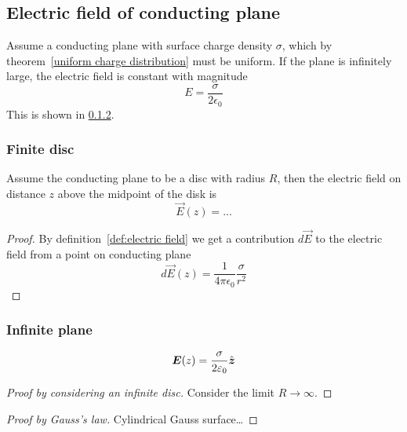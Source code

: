 \subsection{Electric field of conducting plane}
\label{electric field of conducting plane}

Assume a conducting plane with surface charge density $\sigma$, which
by theorem~\ref{uniform charge distribution} must be uniform. If the
plane is infinitely large, the electric field is constant with magnitude
\begin{equation*}
  E = \frac{\sigma}{2\epsilon_0}
\end{equation*}
This is shown in \ref{electric field of conducting plane infinite}.

\subsubsection{Finite disc}

Assume the conducting plane to be a disc with radius $R$, then the
electric field on distance $z$ above the midpoint of the disk is
\begin{equation*}
  \vec{E}(z) = ...
\end{equation*}
\begin{proof}
  By definition~\ref{def:electric field} we get a contribution
  $d\vec{E}$ to the electric field from a point on conducting plane
  \begin{equation*}
    d\vec{E}(z)=\frac{1}{4\pi\epsilon_0}\frac{\sigma}{r^2}
  \end{equation*}
\end{proof}

\subsubsection{Infinite plane}
\label{electric field of conducting plane infinite}
\begin{equation*}
  \boldsymbol{E}(z) = \frac{\sigma}{2\varepsilon_0}\hat{\boldsymbol{z}}
\end{equation*}
\begin{proof}[Proof by considering an infinite disc]
  Consider the limit $R \to \infty$.
\end{proof}
\begin{proof}[Proof by Gauss's law]
  Cylindrical Gauss surface\ldots
\end{proof}
